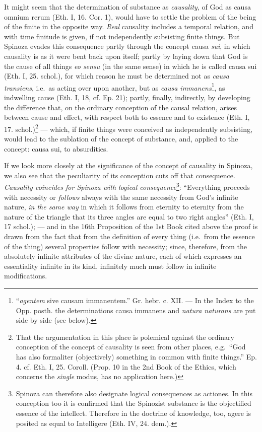 \documentclass[12pt,a4paper,openany]{book}
\newcommand{\opage}[1]{\marginnote{\footnotesize\textit{[#1]}}}
\begin{document}
It might seem that the determination of substance as
\emph{causality}, of God as causa omnium rerum (Eth. I, 16. Cor. 1),
would have to settle the problem of the being of the finite in the opposite way.
\emph{Real} causality includes a temporal relation, and with time
finitude is given, if not independently subsisting finite things.
But Spinoza evades this consequence partly through the concept causa
\emph{sui}, in which causality is as it were bent back upon itself; partly
by laying down that God is the cause of all things \emph{eo sensu} (in the same
sense) in which he is called causa sui (Eth. I, 25. schol.), for which reason
he must be determined not as \emph{causa transiens}, i.e.\ as acting over
upon another, but as \emph{causa immanens}\footnote{``\emph{agentem} sive
causam immanentem.'' Gr. hebr. c. XII. --- In the Index to the Opp. posth.
the determinations causa immanens and \emph{natura
naturans} are put side by side (see below).}, as indwelling cause (Eth. I, 18, cf. Ep.
21); partly, finally, indirectly, by developing the difference that,
on the ordinary conception of the causal relation, arises
between cause and effect, with respect both to essence and to existence
(Eth. I, 17. schol.)\footnote{That the argumentation in this place is
polemical against the ordinary conception of the concept of causality is seen
from other places, e.g.\ ``God has also formaliter (objectively)
something in common with finite things.'' Ep. 4. cf. Eth. I, 25. Coroll.
(Prop. 10 in the 2nd Book of the Ethics, which concerns the \emph{single} modus, has
no application here.)} ---
\opage{56}\setcounter{footnote}{0}which, if finite things were conceived as independently subsisting,
would lead to the sublation of the concept of substance, and, applied to the
concept: causa sui, to absurdities.

If we look more closely at the significance of the concept of causality in Spinoza, we
also see that the peculiarity of its conception cuts off that
consequence. \emph{Causality coincides for Spinoza with
logical consequence}\footnote{Spinoza can therefore also
designate logical consequences as actiones. In this conception too it is confirmed that
the Spinozist substance is the objectified essence of the intellect.
Therefore in the doctrine of knowledge, too, agere is posited as equal to
Intelligere (Eth. IV, 24. dem.).}: ``Everything proceeds with necessity
or \emph{follows} always with the same necessity from God's infinite
nature, \emph{in the same way} in which it follows from eternity to eternity
from the nature of the triangle that its three angles are equal to two
right angles'' (Eth. I, 17 schol.); --- and in the 16th
Proposition of the 1st Book cited above the proof is drawn from the fact that from the
definition of every thing (i.e.\ from the essence of the thing) several
properties follow with necessity; since, therefore, from the absolutely
infinite attributes of the divine nature, each of which expresses an essentiality
infinite in its kind, infinitely much must follow in infinite modifications.
\end{document}

